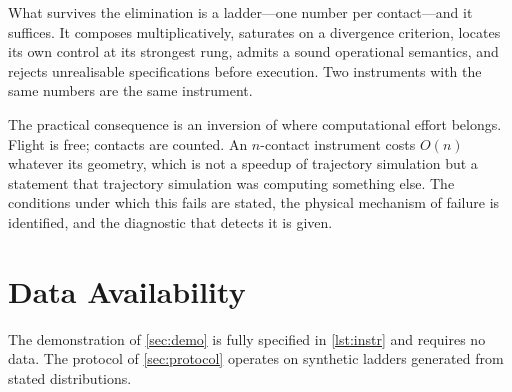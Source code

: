 \documentclass[11pt,a4paper]{article}
\theoremstyle{plain}
\theoremstyle{definition}
\theoremstyle{remark}
\begin{document}
What survives the elimination is a ladder---one number per contact---and it
suffices. It composes multiplicatively, saturates on a divergence criterion,
locates its own control at its strongest rung, admits a sound operational
semantics, and rejects unrealisable specifications before execution. Two
instruments with the same numbers are the same instrument.

The practical consequence is an inversion of where computational effort belongs.
Flight is free; contacts are counted. An $n$-contact instrument costs $O(n)$
whatever its geometry, which is not a speedup of trajectory simulation but a
statement that trajectory simulation was computing something else. The
conditions under which this fails are stated, the physical mechanism of failure
is identified, and the diagnostic that detects it is given.

\section*{Data Availability}

The demonstration of \cref{sec:demo} is fully specified in \cref{lst:instr} and
requires no data. The protocol of \cref{sec:protocol} operates on synthetic
ladders generated from stated distributions.



\end{document}
